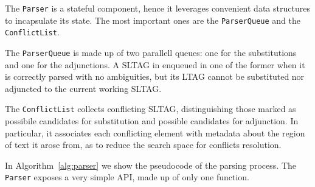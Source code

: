 The \texttt{Parser} is a stateful component, hence it leverages convenient data structures to incapsulate its state.
%
The most important ones are the \texttt{ParserQueue} and the \texttt{ConflictList}.

The \texttt{ParserQueue} is made up of two parallell queues: one for the substitutions and one for the adjunctions. A SLTAG in enqueued in one of the former when it is correctly parsed with no ambiguities, but its LTAG cannot be substituted nor adjuncted to the current working SLTAG.

The \texttt{ConflictList} collects conflicting SLTAG, distinguishing those marked as possibile candidates for substitution and possible candidates for adjunction. In particular, it associates each conflicting element with metadata about the region of text it arose from, as to reduce the search space for conflicts resolution.

In Algorithm~\ref{alg:parser} we show the pseudocode of the parsing process.
%
The \texttt{Parser} exposes a very simple API, made up of only one function.

